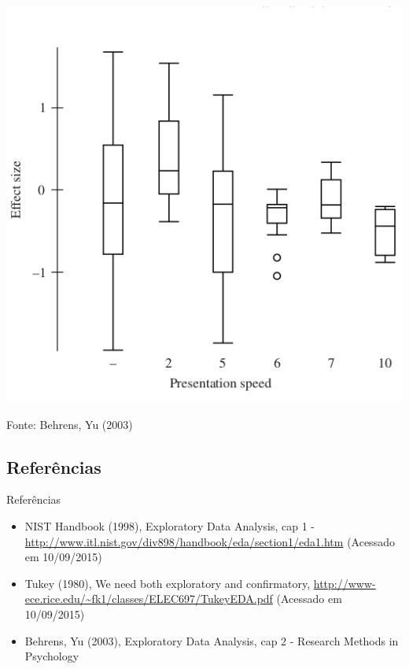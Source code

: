 \documentclass{beamer}
\begin{document}
\begin{frame}
  \begin{center}
    \includegraphics[height=0.7\textheight]{EDA/eda-boxplot2}
  \end{center}
  Fonte: Behrens, Yu (2003)
\end{frame}

\subsection{Referências}

\begin{frame}{Referências}
  \begin{itemize}
  \item<1-> NIST Handbook (1998), Exploratory Data Analysis, cap 1 -
    \url{http://www.itl.nist.gov/div898/handbook/eda/section1/eda1.htm}
    (Acessado em 10/09/2015)
  \item<1-> Tukey (1980), We need both exploratory and confirmatory,
    \url{http://www-ece.rice.edu/~fk1/classes/ELEC697/TukeyEDA.pdf}
    (Acessado em 10/09/2015)
  \item<1-> Behrens, Yu (2003), Exploratory Data Analysis, cap 2 -
    Research Methods in Psychology
  \end{itemize}
\end{frame}
\end{document}
